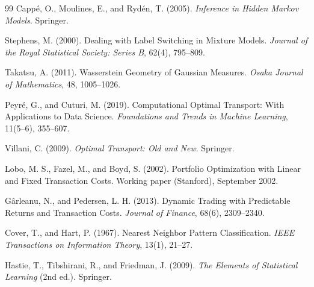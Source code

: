 \documentclass[11pt]{article}
\begin{document}
\begin{thebibliography}{99}
Capp\'e, O., Moulines, E., and Ryd\'en, T. (2005).
\newblock \emph{Inference in Hidden Markov Models}.
\newblock Springer.

Stephens, M. (2000).
\newblock Dealing with Label Switching in Mixture Models.
\newblock \emph{Journal of the Royal Statistical Society: Series B}, 62(4), 795--809.

Takatsu, A. (2011).
\newblock Wasserstein Geometry of Gaussian Measures.
\newblock \emph{Osaka Journal of Mathematics}, 48, 1005--1026.

Peyr\'e, G., and Cuturi, M. (2019).
\newblock Computational Optimal Transport: With Applications to Data Science.
\newblock \emph{Foundations and Trends in Machine Learning}, 11(5--6), 355--607.

Villani, C. (2009).
\newblock \emph{Optimal Transport: Old and New}.
\newblock Springer.

Lobo, M. S., Fazel, M., and Boyd, S. (2002).
\newblock Portfolio Optimization with Linear and Fixed Transaction Costs.
\newblock Working paper (Stanford), September 2002.

G\^{a}rleanu, N., and Pedersen, L. H. (2013).
\newblock Dynamic Trading with Predictable Returns and Transaction Costs.
\newblock \emph{Journal of Finance}, 68(6), 2309--2340.

Cover, T., and Hart, P. (1967).
\newblock Nearest Neighbor Pattern Classification.
\newblock \emph{IEEE Transactions on Information Theory}, 13(1), 21--27.

Hastie, T., Tibshirani, R., and Friedman, J. (2009).
\newblock \emph{The Elements of Statistical Learning} (2nd ed.).
\newblock Springer.
\end{thebibliography}
\end{document}
